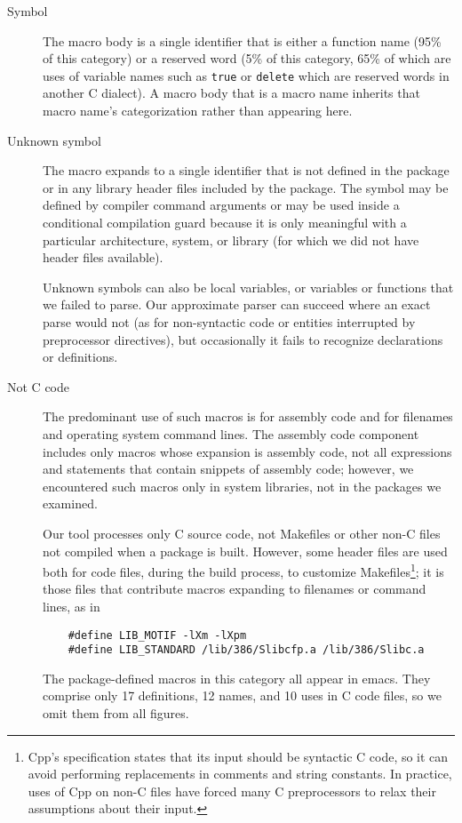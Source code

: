 \documentclass[10pt]{article}
\newcommand{\pkg}[1]{\textsf{#1}}
\begin{document}
\begin{description}
\item[Symbol]
  The macro body is a single identifier that is either a function name
  (95\% of this category) or a reserved word (5\% of this category, 65\% of
  which are uses of variable names such as {\tt true} or {\tt delete} which
  are reserved words in another C dialect).  A macro body that is a macro
  name inherits that macro name's categorization rather than appearing
  here.


\item[Unknown symbol]
  The macro expands to a single identifier that is not defined in the package
  or in any library header files included by the package.  The symbol may
  be defined by compiler command arguments or may be used inside a
  conditional compilation guard because it is only meaningful 
  with a particular architecture, system, or library (for which we did not
  have header files available).
  
  Unknown symbols can also be local variables, or variables or functions that we failed to
  parse.  Our approximate parser can succeed where an exact parse would not
  (as for non-syntactic code or entities interrupted by preprocessor
  directives), but occasionally it fails to recognize declarations or
  definitions.

\item[Not C code]\label{page:not-c-code}
  The predominant use of such macros is for assembly code and for filenames
  and operating system command lines.  The assembly code component includes
  only macros whose expansion is assembly code, not all expressions and
  statements that contain snippets of assembly code; however, we
  encountered such macros only in system libraries, not in the packages we
  examined.  
  
  Our tool processes only C source code, not Makefiles or other non-C files
  not compiled when a package is built.  However, some header files are
  used both for code files, during the build process, to customize
  Makefiles\footnote{Cpp's specification states that its input should be
    syntactic C code, so it can avoid performing replacements in comments
    and string constants.  In practice, uses of Cpp on non-C files have
    forced many C preprocessors to relax their assumptions about their
    input.}; it is those files that contribute macros expanding to
  filenames or command lines, as in
\begin{verbatim}
    #define LIB_MOTIF -lXm -lXpm
    #define LIB_STANDARD /lib/386/Slibcfp.a /lib/386/Slibc.a
\end{verbatim}
  The package-defined macros in this category all appear in \pkg{emacs}.
  They comprise only 17 definitions, 12 names, and 10 uses in C
  code files, so we omit them from all figures.
  

\end{description}
\end{document}
